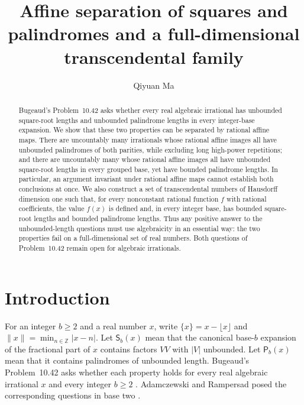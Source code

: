 \documentclass[11pt,reqno,a4paper]{amsart}
\title[Affine separation and a transcendental family]
{Affine separation of squares and palindromes and a full-dimensional transcendental family}
\date{}
\theoremstyle{remark}
\newcommand{\Z}{\mathbb Z}
\newcommand{\dist}[1]{\lVert#1\rVert}
\begin{document}
\author[Qiyuan Ma]{Qiyuan Ma\\[6pt]\protect\usebox{\affilbox}}

\begin{abstract}
Bugeaud's Problem~10.42 asks whether every real algebraic irrational has unbounded square-root lengths and unbounded palindrome lengths in every integer-base expansion. We show that these two properties can be separated by rational affine maps. There are uncountably many irrationals whose rational affine images all have unbounded palindromes of both parities, while excluding long high-power repetitions; and there are uncountably many whose rational affine images all have unbounded square-root lengths in every grouped base, yet have bounded palindrome lengths. In particular, an argument invariant under rational affine maps cannot establish both conclusions at once. We also construct a set of transcendental numbers of Hausdorff dimension one such that, for every nonconstant rational function $f$ with rational coefficients, the value $f(x)$ is defined and, in every integer base, has bounded square-root lengths and bounded palindrome lengths. Thus any positive answer to the unbounded-length questions must use algebraicity in an essential way: the two properties fail on a full-dimensional set of real numbers. Both questions of Problem~10.42 remain open for algebraic irrationals.
\end{abstract}
\maketitle

\section{Introduction}\label{sec:intro}

For an integer $b\ge2$ and a real number $x$, write $\{x\}=x-\lfloor x\rfloor$ and $\dist{x}=\min_{n\in\Z}|x-n|$. Let $\mathsf S_b(x)$ mean that the canonical base-$b$ expansion of the fractional part of $x$ contains factors $VV$ with $|V|$ unbounded. Let $\mathsf P_b(x)$ mean that it contains palindromes of unbounded length. Bugeaud's Problem~10.42 asks whether each property holds for every real algebraic irrational $x$ and every integer $b\ge2$ \cite[p.~220]{Bugeaud}. Adamczewski and Rampersad posed the corresponding questions in base two \cite{AR}.
\end{document}
